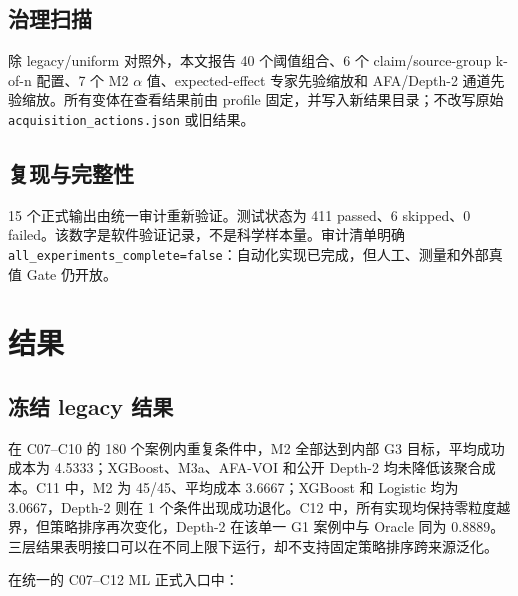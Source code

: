 \documentclass[conference,a4paper,10pt]{IEEEtran}
\begin{document}
\subsection{治理扫描}
除 legacy/uniform 对照外，本文报告 40 个阈值组合、6 个 claim/source-group k-of-n 配置、7 个 M2 $\alpha$ 值、expected-effect 专家先验缩放和 AFA/Depth-2 通道先验缩放。所有变体在查看结果前由 profile 固定，并写入新结果目录；不改写原始 \texttt{acquisition\_actions.json} 或旧结果。

\subsection{复现与完整性}
15 个正式输出由统一审计重新验证。测试状态为 411 passed、6 skipped、0 failed。该数字是软件验证记录，不是科学样本量。审计清单明确 \texttt{all\_experiments\_complete=false}：自动化实现已完成，但人工、测量和外部真值 Gate 仍开放。

\section{结果}
\subsection{冻结 legacy 结果}
在 C07–C10 的 180 个案例内重复条件中，M2 全部达到内部 G3 目标，平均成功成本为 4.5333；XGBoost、M3a、AFA-VOI 和公开 Depth-2 均未降低该聚合成本。C11 中，M2 为 45/45、平均成本 3.6667；XGBoost 和 Logistic 均为 3.0667，Depth-2 则在 1 个条件出现成功退化。C12 中，所有实现均保持零粒度越界，但策略排序再次变化，Depth-2 在该单一 G1 案例中与 Oracle 同为 0.8889。三层结果表明接口可以在不同上限下运行，却不支持固定策略排序跨来源泛化。

在统一的 C07–C12 ML 正式入口中：

\begin{table}[t]
  \centering
  \caption{冻结 legacy 成本下的 ML 正式入口结果}
  \label{tab:legacy-results}
\end{table}
\end{document}
